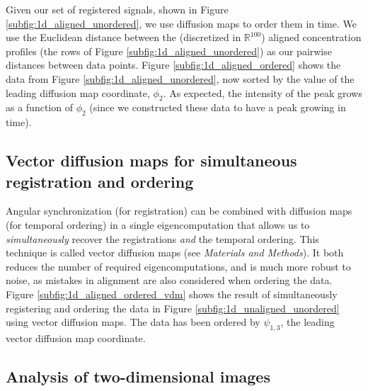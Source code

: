 \documentclass{pnastwo}
\begin{document}
\begin{article}
Given our set of registered signals, shown in Figure \ref{subfig:1d_aligned_unordered}, we use diffusion maps to order them in time.
%
We use the Euclidean distance between the (discretized in $\mathbb{R}^{100}$) aligned concentration profiles (the rows of Figure \ref{subfig:1d_aligned_unordered}) as our pairwise distances between data points.
%
Figure \ref{subfig:1d_aligned_ordered} shows the data from Figure \ref{subfig:1d_aligned_unordered}, now sorted by the value of the leading diffusion map coordinate, $\phi_2$.
%
As expected, the intensity of the peak grows as a function of $\phi_2$ (since we constructed these data
to have a peak growing in time).
%
%

\subsection{Vector diffusion maps for simultaneous registration and ordering}

%
%
Angular synchronization (for registration) can be combined with diffusion maps (for temporal ordering) in a single eigencomputation that allows us to {\it simultaneously} recover the registrations {\it and} the temporal ordering.
%
This technique is called vector diffusion maps \cite{singer2012vector} (see {\it Materials and Methods}).
%
It both reduces the number of required eigencomputations, and is much more robust to noise, as mistakes in alignment are also considered when ordering the data.
%
Figure \ref{subfig:1d_aligned_ordered_vdm} shows the result of simultaneously registering and ordering the data in Figure \ref{subfig:1d_unaligned_unordered} using vector diffusion maps.
%
The data has been ordered by $\psi_{1, 3}$, the leading vector diffusion map coordinate.

\subsection{Analysis of two-dimensional images}


\end{article}
\end{document}
